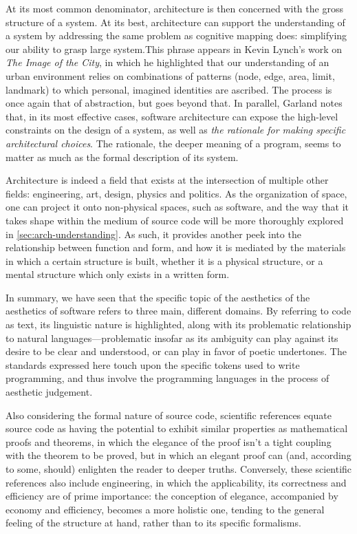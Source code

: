 At its most common denominator, architecture is then concerned with the gross structure of a system. At its best, architecture can support the understanding of a system by addressing the same problem as cognitive mapping does: simplifying our ability to grasp large system.This phrase appears in Kevin Lynch's work on \emph{The Image of the City}, in which he highlighted that our understanding of an urban environment relies on combinations of patterns (node, edge, area, limit, landmark) to which personal, imagined identities are ascribed. The process is once again that of abstraction, but goes beyond that. In parallel, Garland notes that, in its most effective cases, software architecture can expose the high-level constraints on the design of a system, as well as \emph{the rationale for making specific architectural choices}. The rationale, the deeper meaning of a program, seems to matter as much as the formal description of its system.

Architecture is indeed a field that exists at the intersection of multiple other fields: engineering, art, design, physics and politics. As the organization of space, one can project it onto non-physical spaces, such as software, and the way that it takes shape within the medium of source code will be more thoroughly explored in \ref{sec:arch-understanding}. As such, it provides another peek into the relationship between function and form, and how it is mediated by the materials in which a certain structure is built, whether it is a physical structure, or a mental structure which only exists in a written form.

In summary, we have seen that the specific topic of the aesthetics of the aesthetics of software refers to three main, different domains. By referring to code as text, its linguistic nature is highlighted, along with its problematic relationship to natural languages—problematic insofar as its ambiguity can play against its desire to be clear and understood, or can play in favor of poetic undertones. The standards expressed here touch upon the specific tokens used to write programming, and thus involve the programming languages in the process of aesthetic judgement.

Also considering the formal nature of source code, scientific references equate source code as having the potential to exhibit similar properties as mathematical proofs and theorems, in which the elegance of the proof isn't a tight coupling with the theorem to be proved, but in which an elegant proof can (and, according to some, should) enlighten the reader to deeper truths. Conversely, these scientific references also include engineering, in which the applicability, its correctness and efficiency are of prime importance: the conception of elegance, accompanied by economy and efficiency, becomes a more holistic one, tending to the general feeling of the structure at hand, rather than to its specific formalisms.

